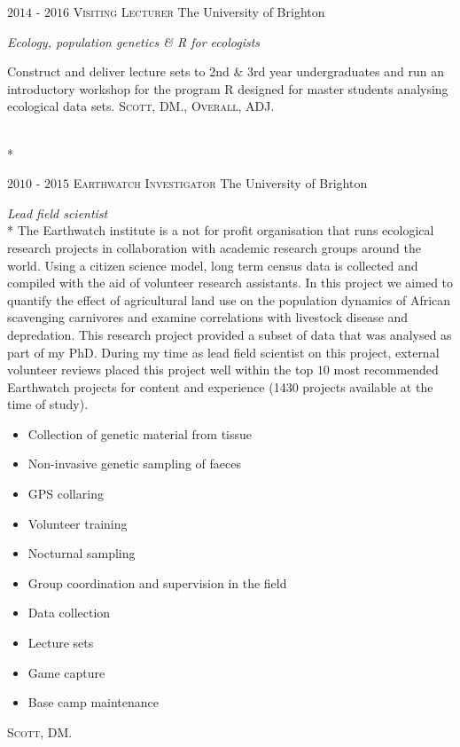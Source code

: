 \documentclass[hidelinks]{james-cv} %
\begin{document}

\begin{entrylist}
\entry
{$2014$ - $2016$}
{\textsc{Visiting Lecturer}}
{The University of Brighton}
{\bodyfontsc\color{gray}{Evolution and ecology: } \emph{Ecology, population genetics \& R for ecologists} 
\color{gray}\normalsize\thinfont\item Construct and deliver lecture sets to 2nd \& 3rd year undergraduates and run an introductory workshop for the program R designed for master students analysing ecological data sets.
\bodyfontsc\nolinebreak\color{gray}{Line Managers: }\textsc{Scott, DM., Overall, ADJ.}}\\*

\entry
{$2010$ - $2015$}
{\textsc{Earthwatch Investigator}}
{The University of Brighton}
{\bodyfontsc\color{gray}{The Scavengers of South Africa: } \emph{Lead field scientist}\\*
\color{gray}\normalsize\thinfont The Earthwatch institute is a not for profit organisation that runs ecological research projects in collaboration with academic research groups around the world. Using a citizen science model, long term census data is collected and compiled with the aid of volunteer research assistants. In this project we aimed to quantify the effect of agricultural land use on the population dynamics of African scavenging carnivores and examine correlations with livestock disease and depredation. This research project provided a subset of data that was analysed as part of my PhD. During my time as lead field scientist on this project, external volunteer reviews placed this project well within the top $10$ most recommended Earthwatch projects for content and experience (1430 projects available at the time of study).   
\color{gray}\normalsize\thinfont            
\begin{itemize}
\item Collection of genetic material from tissue
\item Non-invasive genetic sampling of faeces
\item GPS collaring 
\item Volunteer training
\item Nocturnal sampling
\item Group coordination and supervision in the field
\item Data collection
\item Lecture sets
\item Game capture
\item Base camp maintenance
\end{itemize}  
\bodyfontsc{}\textsc{Scott, DM.}}
\end{entrylist}
\end{document}

